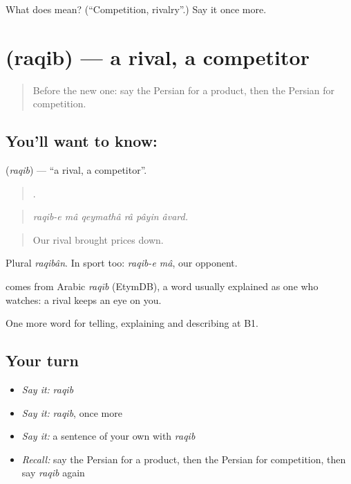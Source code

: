 \begin{tcolorbox}[breakable,colback=teal!4,colframe=teal!35!black,title={Before you move on}]
What does  mean? (\textquotedblleft{}Competition, rivalry\textquotedblright{}.) Say it once more.
\end{tcolorbox}
\section[\texorpdfstring{\fa{رقیب} (raqib)}{رقیب (raqib)}]{ (raqib) — a rival, a competitor}

\label{lesson:FA-C383-raqib}



\begin{quote}
Before the new one: say the Persian for a product, then the Persian for competition.
\end{quote}

\subsection*{You'll want to know: }
\textbf{} (\emph{raqib}) — \textquotedblleft{}a rival, a competitor\textquotedblright{}.

\begin{quote}
     .
\end{quote}

\begin{quote}
\emph{raqib-e mâ qeymathâ râ pâyin âvard.}
\end{quote}

\begin{quote}
Our rival brought prices down.
\end{quote}

Plural \emph{raqibân}. In sport too: \emph{raqib-e mâ}, our opponent.

\begin{cousinweb}
\textbf{} comes from Arabic \emph{raqīb} (EtymDB), a word usually explained as one who watches: a rival keeps an eye on you.
\end{cousinweb}

\begin{grammarlens}[title={What you've built}]
One more word for telling, explaining and describing at B1.
\end{grammarlens}

\subsection*{Your turn}
\begin{itemize}
\raggedright
  \item \emph{Say it:} \emph{raqib}
  \item \emph{Say it:} \emph{raqib}, once more
  \item \emph{Say it:} a sentence of your own with \emph{raqib}
  \item \emph{Recall:} say the Persian for a product, then the Persian for competition, then say \emph{raqib} again
\end{itemize}


